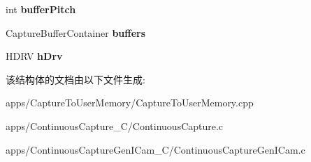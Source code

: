 \begin{DoxyCompactItemize}
\item 
\hypertarget{struct_capture_parameter_acb44e5664f3c75deaa9f654776fc8d0d}{int {\bfseries buffer\+Pitch}}\label{struct_capture_parameter_acb44e5664f3c75deaa9f654776fc8d0d}

\item 
\hypertarget{struct_capture_parameter_ac56a1fb73f07f086b4213d5e4483c56a}{Capture\+Buffer\+Container {\bfseries buffers}}\label{struct_capture_parameter_ac56a1fb73f07f086b4213d5e4483c56a}

\item 
\hypertarget{struct_capture_parameter_a434433f2e311ab3bc92721e473a0c3c1}{H\+D\+R\+V {\bfseries h\+Drv}}\label{struct_capture_parameter_a434433f2e311ab3bc92721e473a0c3c1}

\end{DoxyCompactItemize}


该结构体的文档由以下文件生成\+:\begin{DoxyCompactItemize}
\item 
apps/\+Capture\+To\+User\+Memory/Capture\+To\+User\+Memory.\+cpp\item 
apps/\+Continuous\+Capture\+\_\+\+C/Continuous\+Capture.\+c\item 
apps/\+Continuous\+Capture\+Gen\+I\+Cam\+\_\+\+C/Continuous\+Capture\+Gen\+I\+Cam.\+c\end{DoxyCompactItemize}
